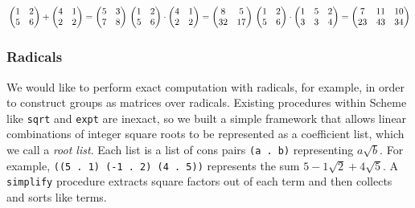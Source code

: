 \documentclass{article}
\begin{document}
\begin{minipage}[t]{0.4\textwidth}
$\\ \\ \\ \\ \\ 
\begin{pmatrix}
1&2\\ 5&6
\end{pmatrix} + 
\begin{pmatrix}
4&1\\ 2&2
\end{pmatrix} = 
\begin{pmatrix}
5&3\\ 7&8
\end{pmatrix} \\ \\ \\ \\ \\ \\ 
\begin{pmatrix}
1&2\\ 5&6
\end{pmatrix} \cdot 
\begin{pmatrix}
4&1\\ 2&2
\end{pmatrix} = 
\begin{pmatrix}
8&5\\ 32&17
\end{pmatrix} \\ \\ \\
\begin{pmatrix}
1&2\\ 5&6
\end{pmatrix} \cdot
\begin{pmatrix}
1&5&2\\ 3&3&4
\end{pmatrix} = 
\begin{pmatrix}
7&11&10\\ 23&43&34
\end{pmatrix}$
 
\end{minipage}
            
            \subsubsection{Radicals}
            
            	We would like to perform exact computation with radicals, for example, in order to construct groups as matrices over radicals. Existing procedures within Scheme like \texttt{sqrt} and \texttt{expt} are inexact, so we built a simple framework that allows linear combinations of integer square roots to be represented as a coefficient list, which we call a \emph{root list}. Each list is a list of cons pairs \texttt{(a . b)} representing $a \sqrt{b}$. For example, \texttt{((5 . 1) (-1 . 2) (4 . 5))} represents the sum $5 - 1\sqrt{2} + 4\sqrt{5}$. A \texttt{simplify} procedure extracts square factors out of each term and then collects and sorts like terms.
	
\end{document}
